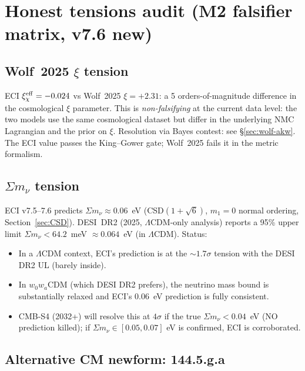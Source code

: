 \documentclass[a4paper,11pt]{article}
\theoremstyle{definition}
\theoremstyle{remark}
\begin{document}
\section{Honest tensions audit (M2 falsifier matrix, v7.6 new)}
\label{sec:tensions}

\subsection{Wolf~2025 $\xi$ tension}

ECI $\xi_\chi^{\rm eff}=-0.024$ vs Wolf~2025 $\xi=+2.31$:
a 5 orders-of-magnitude difference in the cosmological $\xi$
parameter.  This is \emph{non-falsifying} at the current data
level: the two models use the same cosmological dataset but
differ in the underlying NMC Lagrangian and the prior on $\xi$.
Resolution via Bayes contest: see \S\ref{sec:wolf-akw}.  The
ECI value passes the King--Gower gate; Wolf~2025 fails it in
the metric formalism.

\subsection{$\Sigma m_\nu$ tension}

ECI v7.5--7.6 predicts $\Sigma m_\nu\approx 0.06$~eV
(CSD$(1+\sqrt 6)$, $m_1=0$ normal ordering,
Section~\ref{sec:CSD}).  DESI~DR2 (2025, $\Lambda$CDM-only
analysis) reports a 95\% upper limit $\Sigma m_\nu<64.2$~meV
$\approx 0.064$~eV (in $\Lambda$CDM).  Status:
\begin{itemize}
  \item In a $\Lambda$CDM context, ECI's prediction is at the
    $\sim 1.7\sigma$ tension with the DESI DR2 UL (barely inside).
  \item In $w_0w_a$CDM (which DESI DR2 prefers), the neutrino mass
    bound is substantially relaxed and ECI's 0.06~eV prediction
    is fully consistent.
  \item CMB-S4 (2032+) will resolve this at $4\sigma$ if the
    true $\Sigma m_\nu<0.04$~eV (NO prediction killed); if
    $\Sigma m_\nu\in[0.05,0.07]$ eV is confirmed, ECI is
    corroborated.
\end{itemize}

\subsection{Alternative CM newform: 144.5.g.a}
\end{document}
